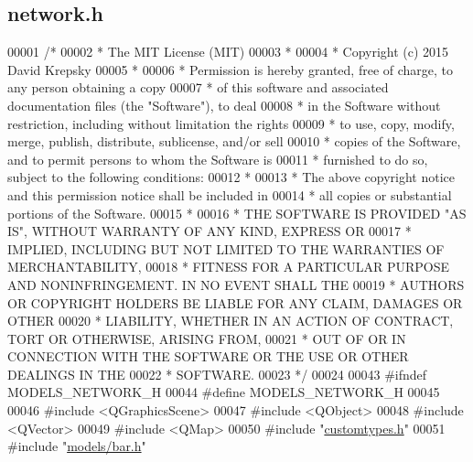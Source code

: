 \hypertarget{network_8h_source}{}\subsection{network.\+h}
\label{network_8h_source}

\begin{DoxyCode}
00001 \textcolor{comment}{/*}
00002 \textcolor{comment}{ * The MIT License (MIT)}
00003 \textcolor{comment}{ *}
00004 \textcolor{comment}{ * Copyright (c) 2015 David Krepsky}
00005 \textcolor{comment}{ *}
00006 \textcolor{comment}{ * Permission is hereby granted, free of charge, to any person obtaining a copy}
00007 \textcolor{comment}{ * of this software and associated documentation files (the "Software"), to deal}
00008 \textcolor{comment}{ * in the Software without restriction, including without limitation the rights}
00009 \textcolor{comment}{ * to use, copy, modify, merge, publish, distribute, sublicense, and/or sell}
00010 \textcolor{comment}{ * copies of the Software, and to permit persons to whom the Software is}
00011 \textcolor{comment}{ * furnished to do so, subject to the following conditions:}
00012 \textcolor{comment}{ *}
00013 \textcolor{comment}{ * The above copyright notice and this permission notice shall be included in}
00014 \textcolor{comment}{ * all copies or substantial portions of the Software.}
00015 \textcolor{comment}{ *}
00016 \textcolor{comment}{ * THE SOFTWARE IS PROVIDED "AS IS", WITHOUT WARRANTY OF ANY KIND, EXPRESS OR}
00017 \textcolor{comment}{ * IMPLIED, INCLUDING BUT NOT LIMITED TO THE WARRANTIES OF MERCHANTABILITY,}
00018 \textcolor{comment}{ * FITNESS FOR A PARTICULAR PURPOSE AND NONINFRINGEMENT. IN NO EVENT SHALL THE}
00019 \textcolor{comment}{ * AUTHORS OR COPYRIGHT HOLDERS BE LIABLE FOR ANY CLAIM, DAMAGES OR OTHER}
00020 \textcolor{comment}{ * LIABILITY, WHETHER IN AN ACTION OF CONTRACT, TORT OR OTHERWISE, ARISING FROM,}
00021 \textcolor{comment}{ * OUT OF OR IN CONNECTION WITH THE SOFTWARE OR THE USE OR OTHER DEALINGS IN THE}
00022 \textcolor{comment}{ * SOFTWARE.}
00023 \textcolor{comment}{ */}
00024 
00043 \textcolor{preprocessor}{#ifndef MODELS\_NETWORK\_H}
00044 \textcolor{preprocessor}{#define MODELS\_NETWORK\_H}
00045 
00046 \textcolor{preprocessor}{#include <QGraphicsScene>}
00047 \textcolor{preprocessor}{#include <QObject>}
00048 \textcolor{preprocessor}{#include <QVector>}
00049 \textcolor{preprocessor}{#include <QMap>}
00050 \textcolor{preprocessor}{#include "\hyperlink{customtypes_8h}{customtypes.h}"}
00051 \textcolor{preprocessor}{#include "\hyperlink{bar_8h}{models/bar.h}"}

\end{DoxyCode}
